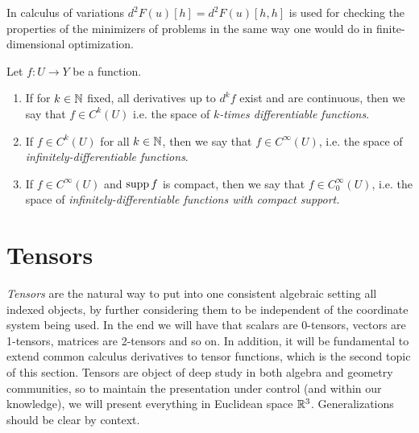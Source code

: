 
In calculus of variations $d^2 F(u)[h] = d^2 F(u)[h,h]$ is used for checking the properties of the minimizers of problems in the same way one would do in finite-dimensional optimization.

\begin{definition}
    Let $f:U\to Y$ be a function. 
    \begin{enumerate}
        \item If for $k\in \mathbb{N}$ fixed, all derivatives up to $d^k f$ exist and are continuous, then we say that $f\in C^k(U)$ i.e. the space of \emph{$k$-times differentiable functions}.
        \item If $f\in C^k(U)$ for all $k\in \mathbb{N}$, then we say that $f\in C^\infty(U)$, i.e. the space of \emph{infinitely-differentiable functions}.
        \item If $f\in C^\infty(U)$ and $\operatorname{\text{supp}} f$ is compact, then we say that $f\in C_0^\infty(U)$, i.e. the space of \emph{infinitely-differentiable functions with compact support.}
    \end{enumerate}
\end{definition}

\section{Tensors}\label{sec:tensors}
\emph{Tensors} are the natural way to put into one consistent algebraic setting all indexed objects, by further considering them to be independent of the coordinate system being used. In the end we will have that scalars are 0-tensors, vectors are 1-tensors, matrices are 2-tensors and so on. In addition, it will be fundamental to extend common calculus derivatives to tensor functions, which is the second topic of this section. Tensors are object of deep study in both algebra and geometry communities, so to maintain the presentation under control (and within our knowledge), we will present everything in Euclidean space $\mathbb{R}^3$. Generalizations should be clear by context. 

